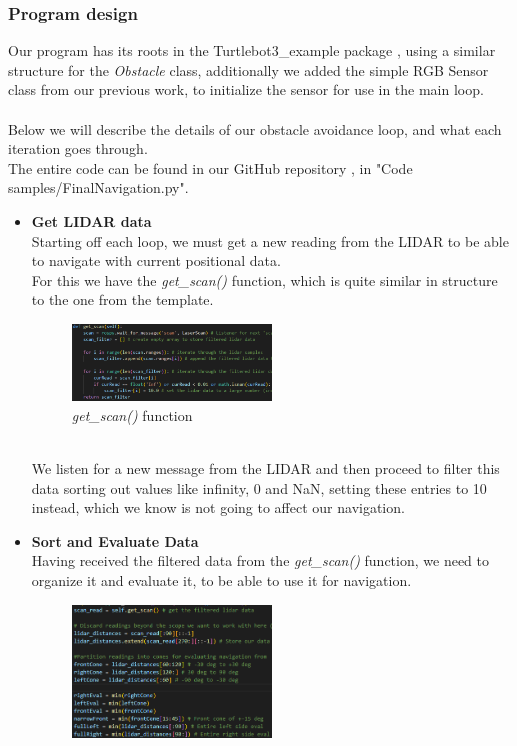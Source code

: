 \documentclass[conference]{IEEEtran}
\begin{document}
\subsubsection{Program design}\label{program}
Our program has its roots in the Turtlebot3\_example package \cite{b5}, using a similar structure for the \textit{Obstacle} class,
additionally we added the simple RGB Sensor class from our previous work, to initialize the sensor for use in the main loop.
\\\\
Below we will describe the details of our obstacle avoidance loop, and what each iteration goes through.\\
The entire code can be found in our GitHub repository \cite{b9}, in "Code samples/FinalNavigation.py".
\begin{itemize}
\item \textbf{Get LIDAR data}\\
Starting off each loop, we must get a new reading from the LIDAR to be able to navigate with current positional data.\\
For this we have the \textit{get\_scan()} function, which is quite similar in structure to the one from the template.
\begin{figure}[h] %
    \centering
    \includegraphics[width=0.5\textwidth]{get_scan.png}
    \caption{\textit{get\_scan()} function}
\end{figure} \\
We listen for a new message from the LIDAR and then proceed to filter this data sorting out 
values like infinity, 0 and NaN, setting these entries to 10 instead, which we know is not going to affect our navigation.\\
\item \textbf{Sort and Evaluate Data}\\
Having received the filtered data from the \textit{get\_scan()} function, we need to organize it and evaluate it,
to be able to use it for navigation.
\begin{figure}[h] %
    \centering
    \includegraphics[width=0.5\textwidth]{evaluateAndSort.png}

\end{figure}
\end{itemize}
\end{document}

